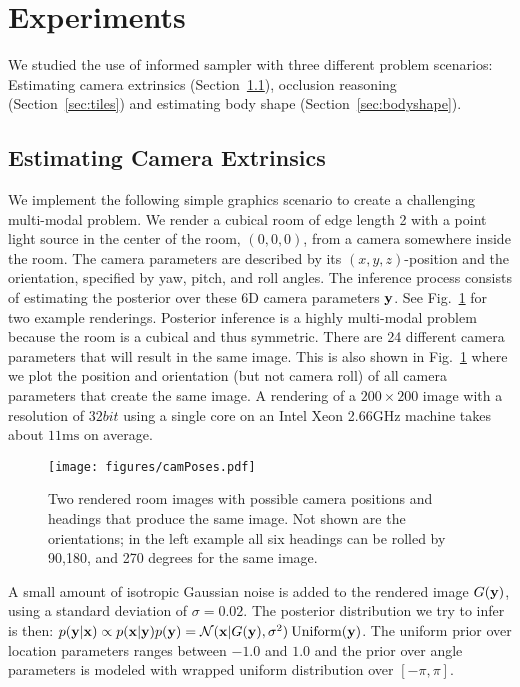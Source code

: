 \section{Experiments}

We studied the use of informed sampler with three different problem
scenarios: Estimating camera extrinsics (Section~\ref{sec:room}),
occlusion reasoning (Section~\ref{sec:tiles}) and
estimating body shape (Section~\ref{sec:bodyshape}).

\subsection{Estimating Camera Extrinsics}
\label{sec:room}

We implement the following simple graphics scenario to create a
challenging multi-modal problem. We render a cubical
room of edge length 2 with a point light source in the center of the
room, $(0,0,0)$, from a camera somewhere inside the
room. The camera parameters are described by its $(x,y,z)$-position
and the orientation, specified by yaw, pitch, and roll angles. The
inference process consists of estimating the posterior over these 6D
camera parameters $\mathbf{y}$. See Fig.~\ref{fig:room} for
two example renderings. Posterior inference is a highly multi-modal problem
because the room is a cubical and thus symmetric. There are 24
different camera parameters that will result in the same
image. This is also shown in Fig.~\ref{fig:room} where we plot the
position and orientation (but not camera roll) of all camera
parameters that create the same image. A rendering of a
$200\times 200$ image with a resolution of $32bit$ using a single core
on an Intel Xeon 2.66GHz machine takes about $11\textrm{ms}$ on
average.

\begin{figure}[!h]
\begin{center}
\centerline{\texttt{[image: figures/camPoses.pdf]}}
  {Two rendered room images with possible camera
  positions and headings that produce the same image. Not shown are
  the orientations; in the left example all six headings can
  be rolled by 90,180, and 270 degrees for the same image.}
\label{fig:room}
\end{center}
\end{figure}

A small amount of isotropic Gaussian noise is added to the rendered
image $G(\mathbf{y})$, using a standard deviation of $\sigma=0.02$. The
posterior distribution we try to infer is then:
$p(\mathbf{y}|\mathbf{x}) \propto p(\mathbf{x}|\mathbf{y})p(\mathbf{y}) =
\mathcal{N}(\mathbf{x}|G(\mathbf{y}),\sigma^2) \: \textrm{Uniform}(\mathbf{y})$.
The uniform prior over location parameters ranges between $-1.0$ and $1.0$ and
the prior over angle parameters is modeled with wrapped uniform distribution over $[-\pi,\pi]$.

